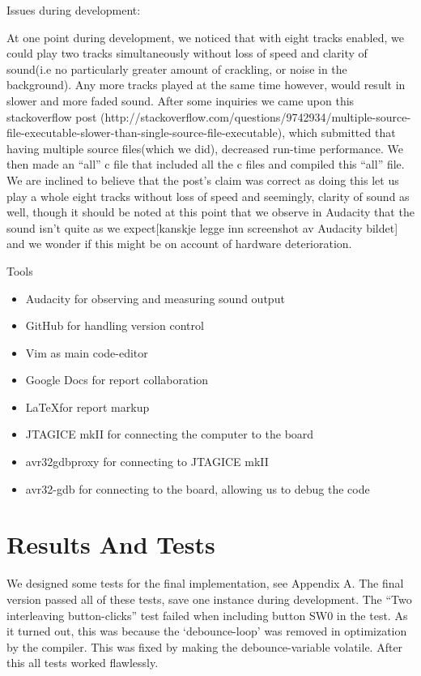\documentclass[a4paper,12pt]{article}
\begin{document}
Issues during development:

At one point during development, we noticed that with eight tracks enabled, we could play two tracks simultaneously without loss of speed and clarity of sound(i.e no particularly greater amount of crackling, or noise in the background). Any more tracks played at the same time however, would result in slower and more faded sound.
	After some inquiries we came upon this stackoverflow post (http://stackoverflow.com/questions/9742934/multiple-source-file-executable-slower-than-single-source-file-executable), which submitted that having multiple source files(which we did), decreased run-time performance. We then made an “all” c file that included all the c files and compiled this “all” file. We are inclined to believe that the post’s claim was correct as doing this let us play a whole eight tracks without loss of speed and seemingly, clarity of sound as well, though it should be noted at this point that we observe in Audacity that the sound isn’t quite as we expect[kanskje legge inn screenshot av Audacity bildet] and we wonder if this might be on account of hardware deterioration.


Tools

\begin{itemize}
\item Audacity for observing and measuring sound output
\item GitHub for handling version control
\item Vim as main code-editor
\item Google Docs for report collaboration
\item \LaTeX for report markup
\item JTAGICE mkII for connecting the computer to the board
\item avr32gdbproxy for connecting to JTAGICE mkII
\item avr32-gdb for connecting to the board, allowing us to debug the code
\end{itemize}

\clearpage
\section{Results And Tests}
We designed some tests for the final implementation, see Appendix A. The final version passed all of these tests, save one instance during development. The  “Two interleaving button-clicks” test failed when including button SW0 in the test. As it turned out, this was because the ‘debounce-loop’ was removed in optimization by the compiler. This was fixed by making the debounce-variable volatile. After this all tests worked flawlessly.
\end{document}
